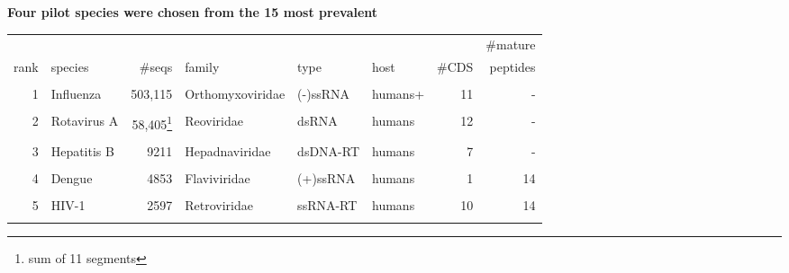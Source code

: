 \documentclass[landscape]{slides}
\begin{document}
\begin{slide}
\begin{center}

\textbf{Four pilot species were chosen from the 15 most prevalent}

\end{center}

\tiny
\begin{tabular}{r|l|r|l|l|l|r|r}
     &                     &              &                &          &        &       & \#mature \\ 
rank & species             & \#seqs       & family         & type     & host   &  \#CDS& peptides \\ \hline
     &                     &              &                &          &        &       &          \\ 
  1  & Influenza           &   503,115    & Orthomyxoviridae& (-)ssRNA& humans+&    11 & -        \\ %
     &                     &              &                &          &        &       &          \\ 
  2  & Rotavirus A         &58,405\footnote{sum of 11 segments}& Reoviridae&dsRNA&humans&   12 & -\\ %
     &                     &              &                &          &        &       &          \\ 
  \textcolor{myorange}{3}  & \textcolor{myorange}{Hepatitis B}         &         \textcolor{myorange}{9211} & \textcolor{myorange}{Hepadnaviridae} & \textcolor{myorange}{dsDNA-RT} & \textcolor{myorange}{humans} &     \textcolor{myorange}{7} & \textcolor{myorange}{-}        \\ %
     &                     &              &                &          &        &       &          \\ 
  \textcolor{myorange}{4}  & \textcolor{myorange}{Dengue}              &         \textcolor{myorange}{4853} & \textcolor{myorange}{Flaviviridae}   & \textcolor{myorange}{(+)ssRNA} & \textcolor{myorange}{humans} &     \textcolor{myorange}{1} & \textcolor{myorange}{14}       \\ %
     &                     &              &                &          &        &       &          \\ 
  5  & HIV-1               &        2597  & Retroviridae   & ssRNA-RT & humans &    10 & 14       \\ %
     &                     &              &                &          &        &       &          \\ 

\end{tabular}
\end{slide}
\end{document}
